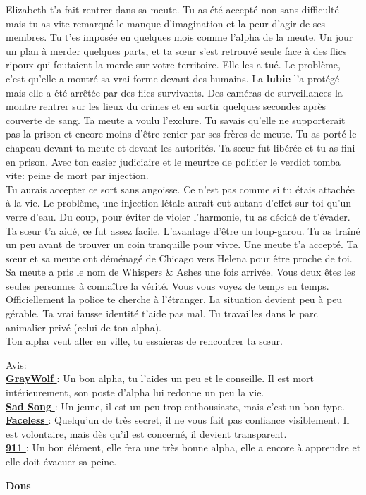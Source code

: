 \documentclass[oneside,12pt]{book}
\newcommand{\Glen}{\textbf{GrayWolf} }
\newcommand{\Mathew}{\textbf{Sad Song} }
\newcommand{\Andy}{\textbf{Faceless} }
\newcommand{\Kelly}{\textbf{911} }
\begin{document}
\begin{flushleft}
\begin{description}
{{Elizabeth t'a fait rentrer dans sa meute. Tu as été accepté non sans difficulté mais tu as vite remarqué le manque d'imagination et la peur d'agir de ses membres. Tu t'es imposée en quelques mois comme l'alpha de la meute.
Un jour un plan à merder quelques parts, et ta sœur s'est retrouvé seule face à des flics ripoux qui foutaient la merde sur votre territoire. Elle les a tué. Le problème, c'est qu'elle a montré sa vrai forme devant des humains. La \textbf{lubie} l'a protégé mais elle a été arrêtée par des flics survivants. Des caméras de surveillances la montre rentrer sur les lieux du crimes et en sortir quelques secondes après couverte de sang.
Ta meute a voulu l'exclure. Tu savais qu'elle ne supporterait pas la prison et encore moins d'être renier par ses frères de meute. Tu as porté le chapeau devant ta meute et devant les autorités.
Ta sœur fut libérée et tu as fini en prison. Avec ton casier judiciaire et le meurtre de policier le verdict tomba vite: peine de mort par injection. \\
Tu aurais accepter ce sort sans angoisse. Ce n'est pas comme si tu étais attachée à la vie. Le problème, une injection létale aurait eut autant d'effet sur toi qu'un verre d'eau. Du coup, pour éviter de violer l'harmonie, tu as décidé de t'évader. Ta sœur t’a aidé, ce fut assez facile. L'avantage d'être un loup-garou. Tu as traîné un peu avant de trouver un coin tranquille pour vivre. Une meute t'a accepté. Ta sœur et sa meute ont déménagé de Chicago vers Helena pour être proche de toi. Sa meute a pris le nom de Whispers \& Ashes une fois arrivée. Vous deux êtes les seules personnes à connaître la vérité. Vous vous voyez de temps en temps. Officiellement la police te cherche à l'étranger. La situation devient peu à peu gérable. Ta vrai fausse identité t'aide pas mal. Tu travailles dans le parc animalier privé (celui de ton alpha).\\
Ton alpha veut aller en ville, tu essaieras de rencontrer ta sœur.}

Avis:\\
\underline{\Glen} :  Un bon alpha, tu l'aides un peu et le conseille. Il est mort intérieurement, son poste d'alpha lui redonne un peu la vie.\\
\underline{\Mathew} : Un jeune, il est un peu trop enthousiaste, mais c'est un bon type.\\
\underline{\Andy} : Quelqu'un de très secret, il ne vous fait pas confiance visiblement. Il est volontaire, mais dès qu'il est concerné, il devient transparent.\\
\underline{\Kelly} : Un bon élément, elle fera une très bonne alpha, elle a encore à apprendre et elle doit évacuer sa peine.\\
}
\end{description}
\clearpage
\textbf{\large Dons}
\vspace{0.5cm}


\end{flushleft}
\end{document}
